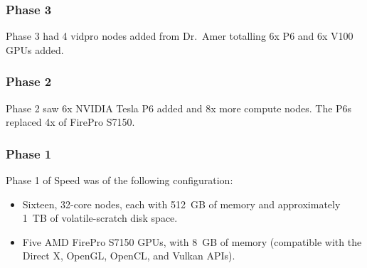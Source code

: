 \subsubsection{Phase 3}
Phase 3 had 4 vidpro nodes added from Dr.~Amer totalling 6x P6 and 6x V100
GPUs added.

\subsubsection{Phase 2}
Phase 2 saw 6x NVIDIA Tesla P6 added and 8x more compute nodes.
The P6s replaced 4x of FirePro S7150.

\subsubsection{Phase 1}
Phase 1 of Speed was of the following configuration:
\begin{itemize}
    \item
    Sixteen, 32-core nodes, each with 512~GB of memory and approximately 1~TB of volatile-scratch disk space.
    \item
    Five AMD FirePro S7150 GPUs, with 8~GB of memory (compatible with the Direct X, OpenGL, OpenCL, and Vulkan APIs).
\end{itemize}